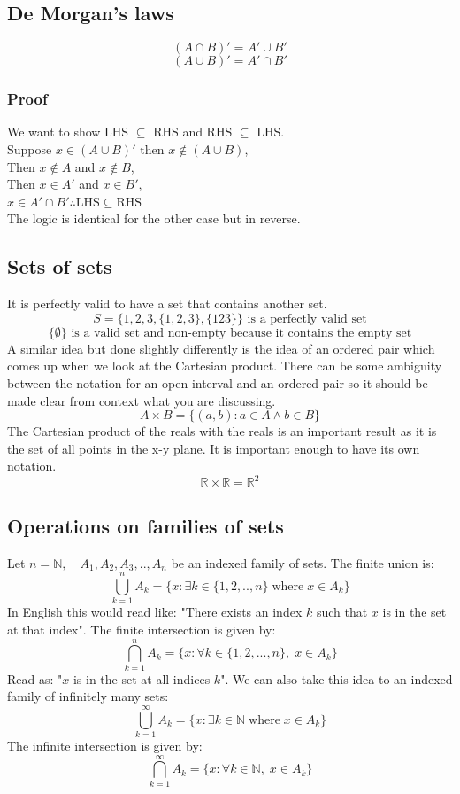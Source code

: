 \documentclass[12pt]{article}
\begin{document}
\subsection*{De Morgan's laws}
\[(A\cap B)'=A'\cup B'\]
\[(A\cup B)'=A'\cap B'\]
\subsubsection*{Proof}
We want to show LHS \(\subseteq\) RHS and RHS \(\subseteq\) LHS.
\\
Suppose \(x\in(A\cup B)'\) then \(x\notin(A\cup B)\),
\\
Then \(x\notin A\) and \(x\notin B\),
\\
Then \(x\in A'\) and \(x\in B'\),
\\
\(x\in A'\cap B' \therefore \text{LHS}\subseteq\text{RHS}\)
\\
The logic is identical for the other case but in reverse.
\subsection*{Sets of sets}
It is perfectly valid to have a set that contains another set.
\[S= \{1,2,3,\{1,2,3\},\{123\}\} \text{ is a perfectly valid set}\]
\[\{\emptyset\}\text{ is a valid set and non-empty because it contains the empty set}\]
A similar idea but done slightly differently is the idea of an ordered pair which comes up when we look at the Cartesian product. There can be some ambiguity between the notation for an open interval and an ordered pair so it should be made clear from context what you are discussing.
\[A\times B = \{(a,b): a\in A \land b\in B\}\]
The Cartesian product of the reals with the reals is an important result as it is the set of all points in the x-y plane. It is important enough to have its own notation.
\[\mathbb{R}\times\mathbb{R}=\mathbb{R}^2\]
\subsection*{Operations on families of sets}
Let \(n=\mathbb{N},\quad A_1,A_2,A_3,..,A_n\) be an indexed family of sets. The finite union is:
\[\bigcup_{k=1}^nA_k=\{x:\exists k\in \{1,2,..,n\}\;\text{where}\;x\in A_k\}\]
In English this would read like: "There exists an index \(k\) such that \(x\) is in the set at that index". The finite intersection is given by:
\[\bigcap_{k=1}^nA_k=\{x:\forall k\in\{1,2,...,n\},\;x\in A_k\}\]
Read as: "\(x\) is in the set at all indices \(k\)". We can also take this idea to an indexed family of infinitely many sets:
\[\bigcup_{k=1}^{\infty}A_k=\{x:\exists k\in \mathbb{N}\;\text{where}\;x\in A_k\}\]
The infinite intersection is given by:
\[\bigcap_{k=1}^{\infty}A_k=\{x:\forall k\in\mathbb{N},\;x\in A_k\}\]
\end{document}
